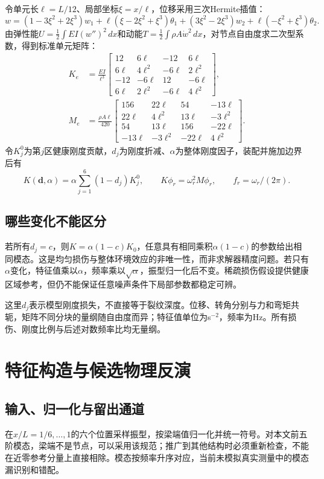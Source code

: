 \documentclass[UTF8,a4paper,11pt,fontset=fandol]{ctexart}
\begin{document}
令单元长$\ell=L/12$、局部坐标$\xi=x/\ell$，位移采用三次Hermite插值：
\[
w=(1-3\xi^2+2\xi^3)w_1+\ell(\xi-2\xi^2+\xi^3)\theta_1
 +(3\xi^2-2\xi^3)w_2+\ell(-\xi^2+\xi^3)\theta_2.
\]
由弹性能$U=\frac12\int EI(w'')^2\,dx$和动能$T=\frac12\int\rho A\dot w^2\,dx$，对节点自由度求二次型系数，得到标准单元矩阵：
\begin{align}
K_e&=\frac{EI}{\ell^3}\begin{bmatrix}12&6\ell&-12&6\ell\\6\ell&4\ell^2&-6\ell&2\ell^2\\-12&-6\ell&12&-6\ell\\6\ell&2\ell^2&-6\ell&4\ell^2\end{bmatrix},\\
M_e&=\frac{\rho A\ell}{420}\begin{bmatrix}156&22\ell&54&-13\ell\\22\ell&4\ell^2&13\ell&-3\ell^2\\54&13\ell&156&-22\ell\\-13\ell&-3\ell^2&-22\ell&4\ell^2\end{bmatrix}.
\end{align}
令$K_j^0$为第$j$区健康刚度贡献，$d_j$为刚度折减、$\alpha$为整体刚度因子，装配并施加边界后有
\begin{equation}
K(\boldsymbol d,\alpha)=\alpha\sum_{j=1}^6(1-d_j)K_j^0,\qquad K\phi_r=\omega_r^2M\phi_r,\qquad f_r=\omega_r/(2\pi).
\end{equation}
\subsection{哪些变化不能区分}
若所有$d_j=c$，则$K=\alpha(1-c)K_0$，任意具有相同乘积$\alpha(1-c)$的参数给出相同模态。这是均匀损伤与整体环境效应的非唯一性，而非求解器精度问题。若只有$\alpha$变化，特征值乘以$\alpha$，频率乘以$\sqrt\alpha$，振型归一化后不变。稀疏损伤假设提供健康区域参考，但仍不能保证任意噪声条件下局部参数都稳定可辨。

这里$d_j$表示模型刚度损失，不直接等于裂纹深度。位移、转角分别与力和弯矩共轭，矩阵不同分块的量纲随自由度而异；特征值单位为s$^{-2}$，频率为Hz。所有损伤、刚度比例与后述对数频率比均无量纲。

\newpage
\section{特征构造与候选物理反演}
\subsection{输入、归一化与留出通道}
在$x/L=1/6,\ldots,1$的六个位置采样振型，按梁端值归一化并统一符号。对本文前五阶模态，梁端不是节点，可以采用该规范；推广到其他结构时必须重新检查，不能在近零参考分量上直接相除。模态按频率升序对应，当前未模拟真实测量中的模态漏识别和错配。
\end{document}
